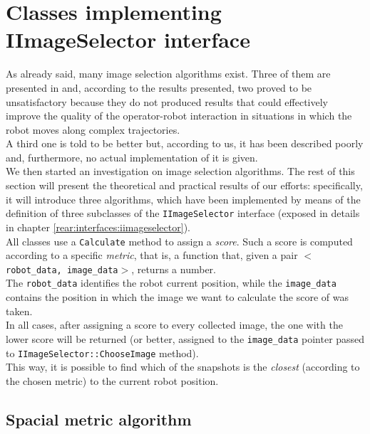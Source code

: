 \section{Classes implementing IImageSelector interface}
\label{concr:iimageselector}

As already said, many image selection algorithms exist. 
Three of them are presented in \cite{sugimoto} and, according 
to the results presented, two proved to be unsatisfactory because 
they do not produced results that could effectively improve 
the quality of the operator-robot interaction in situations 
in which the robot moves along complex trajectories.
\\
A third one is told to be better but, according to us, it has 
been described poorly and, furthermore, no actual implementation 
of it is given.
\\
We then started an investigation on image selection algorithms.
The rest of this section will present the theoretical and practical
results of our efforts: specifically, it will introduce 
three algorithms, which have been implemented by means of 
the definition of three subclasses of the 
\texttt{IImageSelector} interface (exposed in details
in chapter \ref{rear:interfaces:iimageselector}).
\\
All classes use a \texttt{Calculate} method to assign a 
\textit{score}. Such a score is computed according to 
a specific \textit{metric}, that is, a function that, 
given a pair $<$\texttt{robot\_data, image\_data}$>$, 
returns a number. 
\\
The \texttt{robot\_data} identifies the robot current position, 
while the \texttt{image\_data} contains the position 
in which the image we want to calculate the score of
was taken.
\\
In all cases, after assigning a score to every collected image, 
the one with the lower score will be returned 
(or better, assigned to the \texttt{image\_data} pointer 
passed to \texttt{IImageSelector::ChooseImage} method).
\\
This way, it is possible to find which of the snapshots is 
the \textit{closest} (according to the chosen metric) to 
the current robot position.

\subsection{Spacial metric algorithm}
\label{concr:iimageselector:spacial_metric_algorithm}

